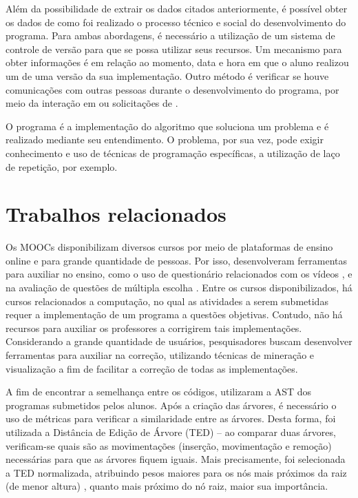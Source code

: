 			Além da possibilidade de extrair os dados citados anteriormente, é possível
			obter os dados de como foi realizado o processo técnico e social do desenvolvimento
			do programa. Para ambas abordagens, é necessário a utilização de um sistema de
			controle de versão para que se possa utilizar seus recursos. Um mecanismo para
			obter informações é em relação ao momento, data e hora em que o aluno realizou
			um  de uma versão da sua implementação. Outro método é verificar
			se houve comunicações com outras pessoas durante o desenvolvimento do programa,
			por meio da interação em  ou solicitações de .
			
			O programa é a implementação do algoritmo que soluciona um problema e é realizado
			mediante seu entendimento. O problema, por sua vez, pode exigir conhecimento e
			uso de técnicas de programação específicas, a utilização de laço de repetição,
			por exemplo. 

	\section{Trabalhos relacionados}
	\label{sec:TrabRel}
	
		Os \acs{MOOC}s disponibilizam diversos cursos por meio de plataformas de ensino
		online e para grande quantidade de pessoas. Por isso, desenvolveram ferramentas
		para auxiliar no ensino, como o uso de questionário relacionados com os vídeos
		\cite{fassbinder2014}, e na avaliação de questões de múltipla escolha \cite{alario2013analysing}.
		Entre os cursos disponibilizados, há cursos relacionados a computação, no qual
		as atividades a serem submetidas requer a implementação de um programa a
		questões objetivas. Contudo, não há recursos para auxiliar os professores
		a corrigirem tais implementações. Considerando a grande quantidade de usuários,
		pesquisadores buscam desenvolver ferramentas para auxiliar na correção,
		utilizando técnicas de mineração e visualização a fim de facilitar a correção
		de todas as implementações.
	
		A fim de encontrar a semelhança entre os códigos, 
		utilizaram a AST dos programas submetidos pelos alunos. Após a criação das
		árvores, é necessário o uso de métricas para verificar a similaridade entre
		as árvores. Desta forma, foi utilizada a Distância de Edição de Árvore (\ac{TED})
		– ao comparar duas árvores, verificam-se quais são as movimentações (inserção,
		movimentação e remoção) necessárias para que as árvores fiquem iguais. Mais
		precisamente, foi selecionada a \acs{TED} normalizada, atribuindo pesos maiores para
		os nós mais próximos da raiz (de menor altura) \cite{zhang1989simple}, quanto
		mais próximo do nó raiz, maior sua importância.

